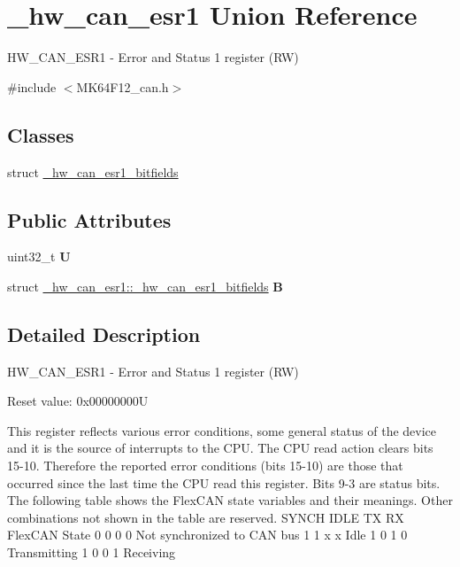 \hypertarget{union__hw__can__esr1}{}\section{\+\_\+hw\+\_\+can\+\_\+esr1 Union Reference}
\label{union__hw__can__esr1}


H\+W\+\_\+\+C\+A\+N\+\_\+\+E\+S\+R1 -\/ Error and Status 1 register (RW)  




{\ttfamily \#include $<$M\+K64\+F12\+\_\+can.\+h$>$}

\subsection*{Classes}
\begin{DoxyCompactItemize}
\item 
struct \hyperlink{struct__hw__can__esr1_1_1__hw__can__esr1__bitfields}{\+\_\+hw\+\_\+can\+\_\+esr1\+\_\+bitfields}
\end{DoxyCompactItemize}
\subsection*{Public Attributes}
\begin{DoxyCompactItemize}
\item 
uint32\+\_\+t {\bfseries U}\hypertarget{union__hw__can__esr1_a15720ff6c130eb74a461d959d162f675}{}\label{union__hw__can__esr1_a15720ff6c130eb74a461d959d162f675}

\item 
struct \hyperlink{struct__hw__can__esr1_1_1__hw__can__esr1__bitfields}{\+\_\+hw\+\_\+can\+\_\+esr1\+::\+\_\+hw\+\_\+can\+\_\+esr1\+\_\+bitfields} {\bfseries B}\hypertarget{union__hw__can__esr1_a3add71e3538eeec1bf79fe1f333de92f}{}\label{union__hw__can__esr1_a3add71e3538eeec1bf79fe1f333de92f}

\end{DoxyCompactItemize}


\subsection{Detailed Description}
H\+W\+\_\+\+C\+A\+N\+\_\+\+E\+S\+R1 -\/ Error and Status 1 register (RW) 

Reset value\+: 0x00000000U

This register reflects various error conditions, some general status of the device and it is the source of interrupts to the C\+PU. The C\+PU read action clears bits 15-\/10. Therefore the reported error conditions (bits 15-\/10) are those that occurred since the last time the C\+PU read this register. Bits 9-\/3 are status bits. The following table shows the Flex\+C\+AN state variables and their meanings. Other combinations not shown in the table are reserved. S\+Y\+N\+CH I\+D\+LE TX RX Flex\+C\+AN State 0 0 0 0 Not synchronized to C\+AN bus 1 1 x x Idle 1 0 1 0 Transmitting 1 0 0 1 Receiving 

